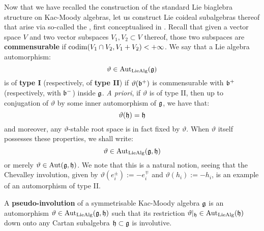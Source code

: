         Now that we have recalled the construction of the standard Lie biaglebra structure on Kac-Moody algebras, let us construct Lie coideal subalgebras thereof that arise via so-called the , first conceptualised in \cite[Definition 1.1]{regelskis_vlaar_kac_moody_pseudo_symmetric_pairs}. Recall that given a vector space $V$ and two vector subspaces $V_1, V_2 \subset V$ thereof, those two subspaces are \textbf{commensurable} if $\operatorname{codim}(V_1 \cap V_2, V_1 + V_2) < +\infty$. We say that a Lie algebra automorphism:
            $$\vartheta \in \operatorname{Aut}_{\mathrm{Lie}\mathrm{Alg}}(\mathfrak{g})$$
        is of \textbf{type I} (respectively, of \textbf{type II}) if $\vartheta(\mathfrak{b}^+)$ is commensurable with $\mathfrak{b}^+$ (respectively, with $\mathfrak{b}^-$) inside $\mathfrak{g}$. \textit{A priori}, if $\vartheta$ is of type II, then up to conjugation of $\vartheta$ by some inner automorphism of $\mathfrak{g}$, we have that:
            $$\vartheta(\mathfrak{h}) = \mathfrak{h}$$
        and moreover, any $\vartheta$-stable root space is in fact fixed by $\vartheta$. When $\vartheta$ itself possesses these properties, we shall write:
            $$\vartheta \in \operatorname{Aut}_{\mathrm{Lie}\mathrm{Alg}}(\mathfrak{g}, \mathfrak{h})$$
        or merely $\vartheta \in \operatorname{Aut}(\mathfrak{g}, \mathfrak{h})$. We note that this is a natural notion, seeing that the Chevalley involution, given by $\vartheta(e_i^{\pm}) := -e_i^{\mp}$ and $\vartheta(h_i) := -h_i$, is an example of an automorphism of type II. 
        \begin{definition} \label{def: pseudo_involutions}
            A \textbf{pseudo-involution} of a symmetrisable Kac-Moody algebra $\mathfrak{g}$ is an automorphism $\vartheta \in \operatorname{Aut}_{\mathrm{Lie}\mathrm{Alg}}(\mathfrak{g}, \mathfrak{h})$ such that its restriction $\vartheta|_{\mathfrak{h}} \in \operatorname{Aut}_{\mathrm{Lie}\mathrm{Alg}}(\mathfrak{h})$ down onto any Cartan subalgebra $\mathfrak{h} \subset \mathfrak{g}$ is involutive. 
        \end{definition}